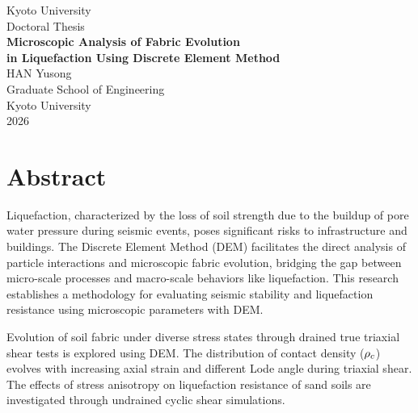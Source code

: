 \documentclass[../main]{subfiles}
\begin{document}

\begin{titlepage}
  \centering
  \vspace*{2cm}

  {\LARGE Kyoto University}\\[1cm]
  {\large Doctoral Thesis}\\[3cm]

  {\Huge\bfseries Microscopic Analysis of Fabric Evolution\\[0.5em]
   in Liquefaction Using Discrete Element Method}\\[3cm]

  {\Large HAN Yusong}\\[2cm]

  {\large Graduate School of Engineering\\
   Kyoto University}\\[2cm]

  {\large 2026}

  \vfill
\end{titlepage}

\cleardoublepage

\chapter*{Abstract}

Liquefaction, characterized by the loss of soil strength due to the buildup of pore water pressure during seismic events, poses significant risks to infrastructure and buildings. The Discrete Element Method (DEM) facilitates the direct analysis of particle interactions and microscopic fabric evolution, bridging the gap between micro-scale processes and macro-scale behaviors like liquefaction. This research establishes a methodology for evaluating seismic stability and liquefaction resistance using microscopic parameters with DEM.

Evolution of soil fabric under diverse stress states through drained true triaxial shear tests is explored using DEM. The distribution of contact density ($\rho_c$) evolves with increasing axial strain and different Lode angle during triaxial shear. The effects of stress anisotropy on liquefaction resistance of sand soils are investigated through undrained cyclic shear simulations.
\end{document}
